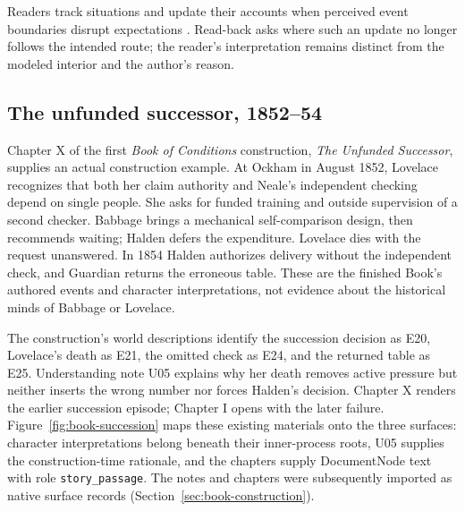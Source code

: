 \documentclass[11pt,a4paper]{article}
\begin{document}
Readers track situations and update their accounts when perceived event
boundaries disrupt expectations \cite{zacksEtAl2007event,zwaanRadvansky1998}.
Read-back asks where such an update no longer follows the intended route;
the reader's interpretation remains distinct from the modeled interior and
the author's reason.

\subsection{The unfunded successor, 1852--54}

Chapter X of the first \emph{Book of Conditions} construction, \emph{The Unfunded
Successor}, supplies an actual construction example. At Ockham in August
1852, Lovelace recognizes that both her claim authority and Neale's independent
checking depend on single people. She asks for funded training and outside
supervision of a second checker. Babbage brings a mechanical self-comparison
design, then recommends waiting; Halden defers the expenditure. Lovelace dies
with the request unanswered. In 1854 Halden authorizes delivery without the
independent check, and Guardian returns the erroneous table. These are the
finished Book's authored events and character interpretations, not evidence
about the historical minds of Babbage or Lovelace.

The construction's world descriptions identify the succession decision as
E20, Lovelace's death as E21, the omitted check as E24, and the returned table
as E25. Understanding note U05 explains why her death removes active pressure
but neither inserts the wrong number nor forces Halden's decision. Chapter X
renders the earlier succession episode; Chapter I opens with the later
failure. Figure~\ref{fig:book-succession} maps these existing materials onto the
three surfaces: character interpretations belong beneath their inner-process
roots, U05 supplies the construction-time rationale, and the chapters supply
DocumentNode text with role \texttt{story\_passage}. The notes and chapters were
subsequently imported as native surface records
(Section~\ref{sec:book-construction}).
\end{document}

